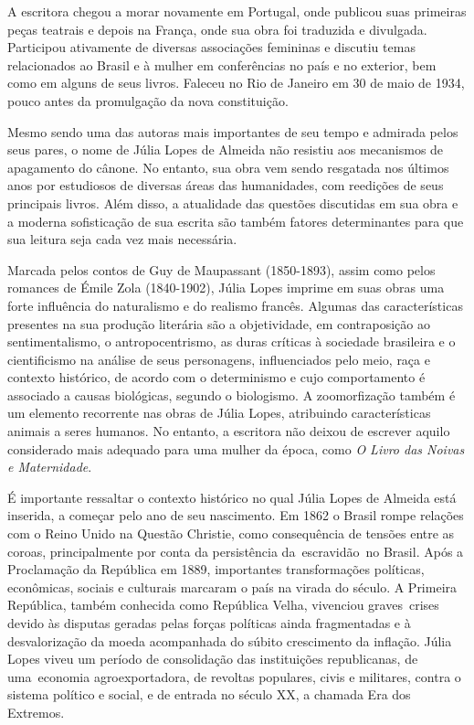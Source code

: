 \documentclass[12pt]{extarticle}
\begin{document}


A escritora chegou a morar novamente em Portugal, onde publicou suas
primeiras peças teatrais e depois na França, onde sua obra foi
traduzida e divulgada. Participou ativamente de diversas associações
femininas e discutiu temas relacionados ao Brasil e à mulher em
conferências no país e no exterior, bem como em alguns de seus livros.
Faleceu no Rio de Janeiro em 30 de maio de 1934, pouco antes da
promulgação da nova constituição.

Mesmo sendo uma das autoras mais importantes de seu tempo e admirada
pelos seus pares, o nome de Júlia Lopes de Almeida não resistiu aos
mecanismos de apagamento do cânone. No entanto, sua obra vem sendo
resgatada nos últimos anos por estudiosos de diversas áreas das
humanidades, com reedições de seus principais livros. Além disso, a
atualidade das questões discutidas em sua obra e a moderna sofisticação
de sua escrita são também fatores determinantes para que sua leitura
seja cada vez mais necessária.




Marcada pelos contos de Guy de Maupassant (1850-1893), assim como pelos
romances de Émile Zola (1840-1902), Júlia Lopes imprime em suas obras
uma forte influência do naturalismo e do realismo francês. Algumas das
características presentes na sua produção literária são a objetividade,
em contraposição ao sentimentalismo, o antropocentrismo, as duras
críticas à sociedade brasileira e o cientificismo na análise de seus
personagens, influenciados pelo meio, raça e contexto histórico, de
acordo com o determinismo e cujo comportamento é associado a causas
biológicas, segundo o biologismo. A zoomorfização também é um elemento
recorrente nas obras de Júlia Lopes, atribuindo características animais
a seres humanos. No entanto, a escritora não deixou de escrever aquilo
considerado mais adequado para uma mulher da época, como \emph{O Livro
das Noivas e Maternidade}.

É importante ressaltar o contexto histórico no qual Júlia Lopes de
Almeida está inserida, a começar pelo ano de seu nascimento. Em 1862 o
Brasil rompe relações com o Reino Unido na Questão Christie, como
consequência de tensões entre as coroas, principalmente por conta da
persistência da~escravidão~no Brasil. Após a Proclamação da República em
1889, importantes transformações políticas, econômicas, sociais e
culturais marcaram o país na virada do século. A Primeira República,
também conhecida como República Velha, vivenciou graves~crises devido às
disputas geradas pelas forças políticas ainda fragmentadas e à
desvalorização da moeda acompanhada do súbito crescimento da inflação.
Júlia Lopes viveu um período de consolidação das instituições
republicanas, de uma~economia agroexportadora, de revoltas populares,
civis e militares, contra o sistema político e social, e de entrada no
século XX, a chamada Era dos Extremos.
\end{document}
